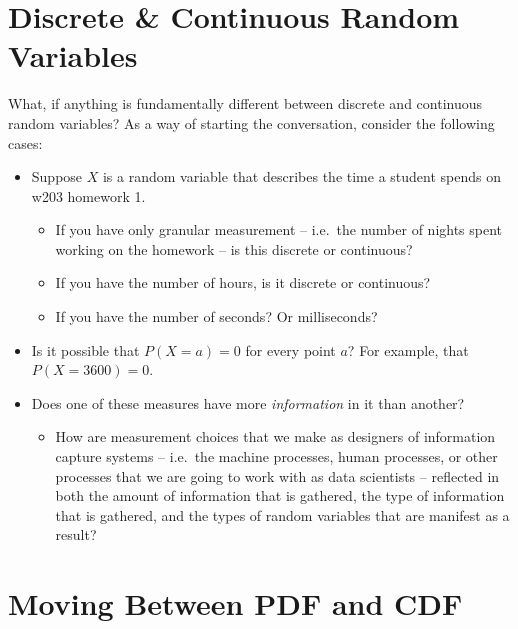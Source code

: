 \documentclass[
]{book}
\providecommand{\tightlist}{%
  \setlength{\itemsep}{0pt}\setlength{\parskip}{0pt}}
\theoremstyle{definition}
\theoremstyle{definition}
\theoremstyle{definition}
\theoremstyle{definition}
\theoremstyle{remark}
\begin{document}
\hypertarget{discrete-continuous-random-variables}{%
\section{Discrete \& Continuous Random Variables}\label{discrete-continuous-random-variables}}

What, if anything is fundamentally different between discrete and continuous random variables? As a way of starting the conversation, consider the following cases:

\begin{itemize}
\tightlist
\item
  Suppose \(X\) is a random variable that describes the time a student spends on w203 homework 1.

  \begin{itemize}
  \tightlist
  \item
    If you have only granular measurement -- i.e.~the number of nights spent working on the homework -- is this discrete or continuous?
  \item
    If you have the number of hours, is it discrete or continuous?
  \item
    If you have the number of seconds? Or milliseconds?
  \end{itemize}
\item
  Is it possible that \(P(X = a) = 0\) for every point \(a\)? For example, that \(P(X = 3600) = 0\).
\item
  Does one of these measures have more \emph{information} in it than another?

  \begin{itemize}
  \tightlist
  \item
    How are measurement choices that we make as designers of information capture systems -- i.e.~the machine processes, human processes, or other processes that we are going to work with as data scientists -- reflected in both the amount of information that is gathered, the type of information that is gathered, and the types of random variables that are manifest as a result?
  \end{itemize}
\end{itemize}

\hypertarget{moving-between-pdf-and-cdf}{%
\section{Moving Between PDF and CDF}\label{moving-between-pdf-and-cdf}}
\end{document}
